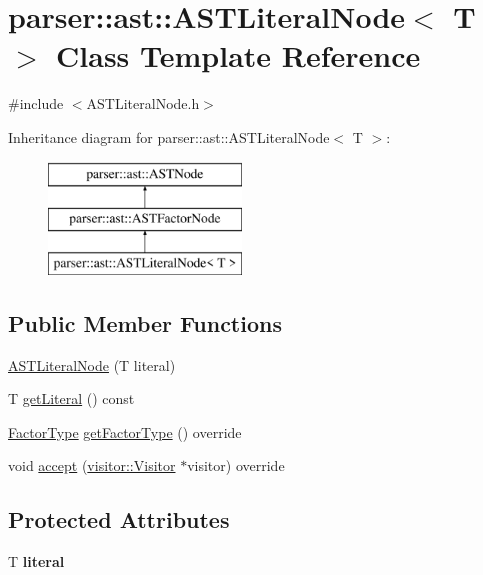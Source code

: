 \hypertarget{classparser_1_1ast_1_1ASTLiteralNode}{}\section{parser\+:\+:ast\+:\+:A\+S\+T\+Literal\+Node$<$ T $>$ Class Template Reference}
\label{classparser_1_1ast_1_1ASTLiteralNode}


{\ttfamily \#include $<$A\+S\+T\+Literal\+Node.\+h$>$}

Inheritance diagram for parser\+:\+:ast\+:\+:A\+S\+T\+Literal\+Node$<$ T $>$\+:\begin{figure}[H]
\begin{center}
\leavevmode
\includegraphics[height=3.000000cm]{dc/d86/classparser_1_1ast_1_1ASTLiteralNode}
\end{center}
\end{figure}
\subsection*{Public Member Functions}
\begin{DoxyCompactItemize}
\item 
\hyperlink{classparser_1_1ast_1_1ASTLiteralNode_a44d0a5e92c58efc35fb9778b56feb725}{A\+S\+T\+Literal\+Node} (T literal)
\item 
T \hyperlink{classparser_1_1ast_1_1ASTLiteralNode_a43466bd413257d43650659383351e612}{get\+Literal} () const
\item 
\hyperlink{ASTFactorNode_8h_afbe2fcc03ef15b74a0c1ed1cda7ab0e8}{Factor\+Type} \hyperlink{classparser_1_1ast_1_1ASTLiteralNode_a08efdbff5f7b0a0b7623ad964a6e4a9f}{get\+Factor\+Type} () override
\item 
void \hyperlink{classparser_1_1ast_1_1ASTLiteralNode_a6d7a907614e19132b9c669f7aa32b735}{accept} (\hyperlink{classvisitor_1_1Visitor}{visitor\+::\+Visitor} $\ast$visitor) override
\end{DoxyCompactItemize}
\subsection*{Protected Attributes}
\begin{DoxyCompactItemize}
\item 
\mbox{\label{classparser_1_1ast_1_1ASTLiteralNode_a3d8332043910f9f6d068c5c22814a13f}} 
T {\bfseries literal}
\end{DoxyCompactItemize}


